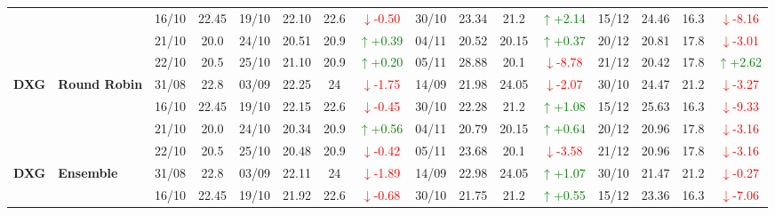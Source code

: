 \documentclass{ieeeaccess}
\begin{document}
{\begin{longtable}{llcc|cccc|cccc|cccc}
& 
& 16/10 & 22.45 & 19/10 & 22.10 & 22.6 & \textcolor{red}{\(\downarrow\)-0.50} & 30/10 & 23.34 & 21.2 & \textcolor{green}{\(\uparrow\)+2.14} & 15/12 & 24.46 & 16.3 & \textcolor{red}{\(\downarrow\)-8.16} \\

& 
& 21/10 & 20.0 & 24/10 & 20.51 & 20.9 & \textcolor{green}{\(\uparrow\)+0.39} & 04/11 & 20.52 & 20.15 & \textcolor{green}{\(\uparrow\)+0.37} & 20/12 & 20.81 & 17.8 & \textcolor{red}{\(\downarrow\)-3.01} \\

&
& 22/10 & 20.5 & 25/10 & 21.10 & 20.9 & \textcolor{green}{\(\uparrow\)+0.20} & 05/11 & 28.88 & 20.1 & \textcolor{red}{\(\downarrow\)-8.78} & 21/12 & 20.42 & 17.8 & \textcolor{green}{\(\uparrow\)+2.62} \\
\midrule


\multirow{4}{*}{\textbf{DXG}} 
& \textbf{Round Robin}
& 31/08 & 22.8 & 03/09 & 22.25 & 24 & \textcolor{red}{\(\downarrow\)-1.75} & 14/09 & 21.98 & 24.05 & \textcolor{red}{\(\downarrow\)-2.07} & 30/10 & 24.47 & 21.2 & \textcolor{red}{\(\downarrow\)-3.27} \\

&
& 16/10 & 22.45 & 19/10 & 22.15 & 22.6 & \textcolor{red}{\(\downarrow\)-0.45} & 30/10 & 22.28 & 21.2 & \textcolor{green}{\(\uparrow\)+1.08} & 15/12 & 25.63 & 16.3 & \textcolor{red}{\(\downarrow\)-9.33} \\

&
& 21/10 & 20.0 & 24/10 & 20.34 & 20.9 & \textcolor{green}{\(\uparrow\)+0.56} & 04/11 & 20.79 & 20.15 & \textcolor{green}{\(\uparrow\)+0.64} & 20/12 & 20.96 & 17.8 & \textcolor{red}{\(\downarrow\)-3.16} \\

&
& 22/10 & 20.5 & 25/10 & 20.48 & 20.9 & \textcolor{red}{\(\downarrow\)-0.42} & 05/11 & 23.68 & 20.1 & \textcolor{red}{\(\downarrow\)-3.58} & 21/12 & 20.96 & 17.8 & \textcolor{red}{\(\downarrow\)-3.16} \\
\midrule


\multirow{4}{*}{\textbf{DXG}} 
& \textbf{Ensemble}
& 31/08 & 22.8 & 03/09 & 22.11 & 24 & \textcolor{red}{\(\downarrow\)-1.89} & 14/09 & 22.98 & 24.05 & \textcolor{green}{\(\uparrow\)+1.07} & 30/10 & 21.47 & 21.2 & \textcolor{red}{\(\downarrow\)-0.27} \\

&
& 16/10 & 22.45 & 19/10 & 21.92 & 22.6 & \textcolor{red}{\(\downarrow\)-0.68} & 30/10 & 21.75 & 21.2 & \textcolor{green}{\(\uparrow\)+0.55} & 15/12 & 23.36 & 16.3 & \textcolor{red}{\(\downarrow\)-7.06} \\


\end{longtable}}
\end{document}

